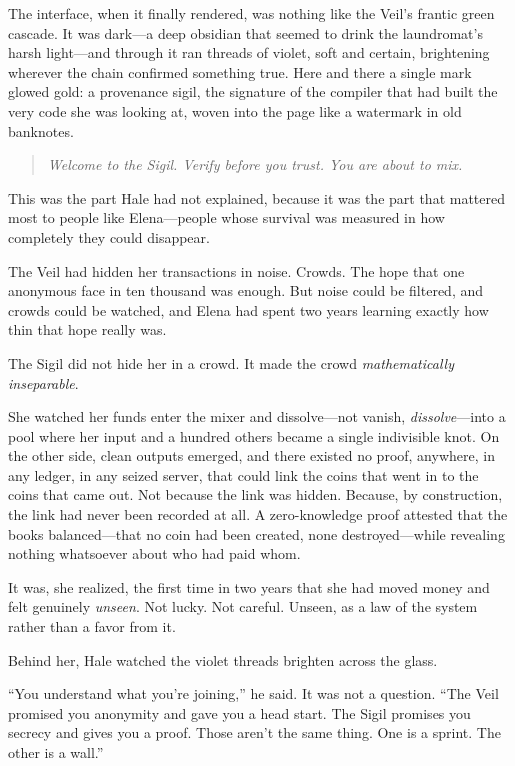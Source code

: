 The interface, when it finally rendered, was nothing like the Veil's frantic green cascade. It was dark---a deep obsidian that seemed to drink the laundromat's harsh light---and through it ran threads of violet, soft and certain, brightening wherever the chain confirmed something true. Here and there a single mark glowed gold: a provenance sigil, the signature of the compiler that had built the very code she was looking at, woven into the page like a watermark in old banknotes.

\begin{quote}
\emph{Welcome to the Sigil. Verify before you trust. You are about to mix.}
\end{quote}

This was the part Hale had not explained, because it was the part that mattered most to people like Elena---people whose survival was measured in how completely they could disappear.

The Veil had hidden her transactions in noise. Crowds. The hope that one anonymous face in ten thousand was enough. But noise could be filtered, and crowds could be watched, and Elena had spent two years learning exactly how thin that hope really was.

The Sigil did not hide her in a crowd. It made the crowd \emph{mathematically inseparable}.

She watched her funds enter the mixer and dissolve---not vanish, \emph{dissolve}---into a pool where her input and a hundred others became a single indivisible knot. On the other side, clean outputs emerged, and there existed no proof, anywhere, in any ledger, in any seized server, that could link the coins that went in to the coins that came out. Not because the link was hidden. Because, by construction, the link had never been recorded at all. A zero-knowledge proof attested that the books balanced---that no coin had been created, none destroyed---while revealing nothing whatsoever about who had paid whom.

It was, she realized, the first time in two years that she had moved money and felt genuinely \emph{unseen}. Not lucky. Not careful. Unseen, as a law of the system rather than a favor from it.

Behind her, Hale watched the violet threads brighten across the glass.

``You understand what you're joining,'' he said. It was not a question. ``The Veil promised you anonymity and gave you a head start. The Sigil promises you secrecy and gives you a proof. Those aren't the same thing. One is a sprint. The other is a wall.''


